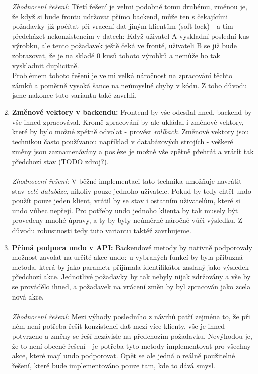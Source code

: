 \begin{enumerate}
	\emph{Zhodnocení řešení:} Třetí řešení je velmi podobné tomu druhému, změnou je, že když si bude frontu udržovat přímo backend, může ten s čekajícími požadavky již počítat při vracení dat jiným klientům (soft lock) - a tím předcházet nekonzistencím v datech: Když uživatel A vyskladní poslední kus výrobku, ale tento požadavek ještě čeká ve frontě, uživateli B se již bude zobrazovat, že je na skladě 0 kusů tohoto výrobků a nemůže ho tak vyskladnit duplicitně.\\
	Problémem tohoto řešení je velmi velká náročnost na zpracování těchto zámků a poměrně vysoká šance na neúmyslné chyby v kódu. Z toho důvodu jsme nakonec tuto variantu také zavrhli.
	\item \textbf{Změnové vektory v backendu:} Frontend by vše odesílal hned, backend by vše ihned zpracovával. Kromě zpracování by ale ukládal i změnové vektory, které by bylo možné zpětně odvolat - provést \emph{rollback}. Změnové vektory jsou technikou často používanou například v databázových strojích - veškeré změny jsou zaznamenávány a posléze je možné vše zpětně přehrát a vrátit tak předchozí stav (TODO zdroj?).\\\\
	\emph{Zhodnocení řešení:} V běžné implementaci tato technika umožňuje navrátit stav \emph{celé databáze}, nikoliv pouze jednoho uživatele. Pokud by tedy chtěl undo použít pouze jeden klient, vrátil by se stav i ostatním uživatelům, které si undo vůbec nepřejí. Pro potřeby undo jednoho klienta by tak musely být provedeny mnohé úpravy, a ty by byly neúměrně náročné vůči výsledku. Z důvodu robustnosti tedy tuto variantu taktéž zavrhujeme.
	\item \textbf{Přímá podpora undo v API:} Backendové metody by nativně podporovaly možnost zavolat na určité akce undo: u vybraných funkcí by byla příbuzná metoda, která by jako parametr přijímala identifikátor zaslaný jako výsledek předchozí akce. Jednotlivé požadavky by tak nebyly nijak zdržovány a vše by se provádělo ihned, a požadavek na vrácení změn by byl zpracován jako zcela nová akce.\\\\
	\emph{Zhodnocení řešení:} Mezi výhody posledního z návrhů patří zejména to, že při něm není potřeba řešit konzistenci dat mezi více klienty, vše je ihned potvrzeno a změny se řeší nezávisle na předchozím požadavku. Nevýhodou je, že to není obecné řešení - je potřeba tyto metody implementovat pro všechny akce, které mají undo podporovat. Opět se ale jedná o reálně použitelné řešení, které bude implementováno pouze tam, kde to dává smysl.
\end{enumerate}

